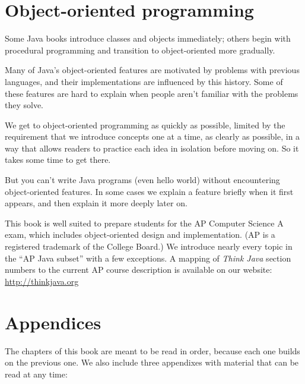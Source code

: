 \documentclass[12pt]{book}
\theoremstyle{exercise}
\begin{document}
\section*{Object-oriented programming}

Some Java books introduce classes and objects immediately; others begin with procedural programming and transition to object-oriented more gradually.

Many of Java's object-oriented features are motivated by problems with previous languages, and their implementations are influenced by this history.
Some of these features are hard to explain when people aren't familiar with the problems they solve.

We get to object-oriented programming as quickly as possible, limited by the requirement that we introduce concepts one at a time, as clearly as possible, in a way that allows readers to practice each idea in isolation before moving on.
So it takes some time to get there.

But you can't write Java programs (even hello world) without encountering object-oriented features.
In some cases we explain a feature briefly when it first appears, and then explain it more deeply later on.

This book is well suited to prepare students for the AP Computer Science A exam, which includes object-oriented design and implementation.
(AP is a registered trademark of the College Board.)
We introduce nearly every topic in the ``AP Java subset'' with a few exceptions.
A mapping of {\it Think Java} section numbers to the current AP course description is available on our website: \url{http://thinkjava.org}



\section*{Appendices}

The chapters of this book are meant to be read in order, because each one builds on the previous one.
We also include three appendixes with material that can be read at any time:
\end{document}

